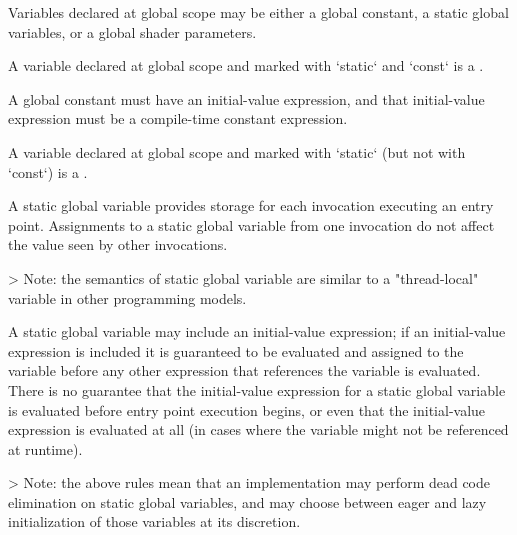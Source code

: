 Variables declared at global scope may be either a global constant, a static global variables, or a global shader parameters.


A variable declared at global scope and marked with `static` and `const` is a .

A global constant must have an initial-value expression, and that initial-value expression must be a compile-time constant expression.


A variable declared at global scope and marked with `static` (but not with `const`) is a .

A static global variable provides storage for each invocation executing an entry point.
Assignments to a static global variable from one invocation do not affect the value seen by other invocations.

> Note: the semantics of static global variable are similar to a "thread-local" variable in other programming models.

A static global variable may include an initial-value expression; if an initial-value expression is included it is guaranteed to be evaluated and assigned to the variable before any other expression that references the variable is evaluated.
There is no guarantee that the initial-value expression for a static global variable is evaluated before entry point execution begins, or even that the initial-value expression is evaluated at all (in cases where the variable might not be referenced at runtime).

> Note: the above rules mean that an implementation may perform dead code elimination on static global variables, and may choose between eager and lazy initialization of those variables at its discretion.


